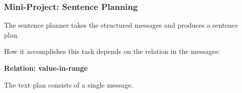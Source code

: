 \begin{frame}
\frametitle{Mini-Project: Sentence Planning}

The sentence planner takes the structured messages and produces a sentence plan.

How it accomplishes this task depends on the relation in the messages:

\vspace{12pt}

\textbf{Relation: value-in-range}

The text plan consists of a single message.

\vspace{12pt}

\begin{center}

\end{center}

\end{frame}
